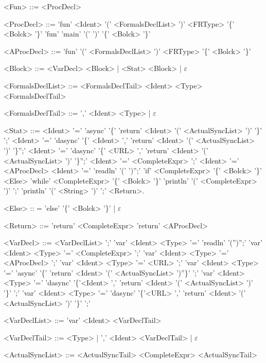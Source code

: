 \begin{grammar}
<Fun> ::=  { <ProcDecl> } 

<ProcDecl> ::=  
'fun' <Ident> '(' <FormalsDeclList> ')' <FRType> '\{' <Bolck> '\}'
\alt 'fun' 'main' '(' ')' '\{' <Bolck> '\}' 

<AProcDecl> ::= 'fun' '(' <FormalsDeclList> ')' <FRType> '\{' <Bolck> '\}'

<Block> ::=  <VarDecl> <Block> | <Stat> <Block> | $\varepsilon$

<FormalsDeclList> ::= 	<FormalsDeclTail> 
						\alt <Ident> <Type> <FormalsDeclTail> 

<FormalsDeclTail> ::= ',' <Ident> <Type> | $\varepsilon$

<Stat> ::= 
			<Ident> '=' 'async' '\{' 'return' <Ident> '(' <ActualSyncList> ')' '\}' ';'
			\alt <Ident> '=' 'dasync' '\{' <Ident> ',' 'return' <Ident> '(' <ActualSyncList> ')' '\}'';'
			\alt <Ident> '=' 'dasync' '\{' <URL> ',' 'return' <Ident> '(' <ActualSyncList> ')' '\}'';'
			\alt <Ident> '=' <CompleteExpr> ';'
			\alt <Ident> '=' <AProcDecl>                                  
			\alt <Ident> '=' 'readln' '(' ')'';'
			\alt 'if' <CompleteExpr> '\{' <Bolck> '\}' <Else>                                        
			\alt 'while' <CompleteExpr> '\{' <Bolck> '\}'                                                      
			\alt 'println' '(' <CompleteExpr> ')' ';'
			\alt 'println' '(' <String> ')' ';'
			\alt <Return>.

<Else> :: =  'else' '\{' <Bolck> '\}' | $\varepsilon$

<Return> ::= 
			'return' <CompleteExpr>
			\alt 'return' <AProcDecl>

<VarDecl> ::= 	<VarDeclList> ';' 
				'var' <Ident>  <Type> '=' 'readln' '('')'';'
				\alt 'var' <Ident>  <Type> '=' <CompleteExpr> ';' 
				\alt 'var' <Ident>  <Type> '=' <AProcDecl> ';'
				\alt 'var' <Ident>  <Type> '=' <URL> ';'
				\alt 'var' <Ident>  <Type> '=' 'async' '\{' 'return' <Ident> '(' <ActualSyncList> ')''\}' ';'
				\alt 'var' <Ident>  <Type> '=' 'dasync' '\{'<Ident> ',' 'return' <Ident> '(' <ActualSyncList> ')' '\}' ';'
				\alt 'var' <Ident>  <Type> '=' 'dasync' '\{'<URL> ',' 'return' <Ident> '(' <ActualSyncList> ')' '\}' ';'
							
<VarDeclList> ::= 'var' <Ident> <VarDeclTail>

<VarDeclTail> ::= <Type> | ',' <Ident> <VarDeclTail> | $\varepsilon$ 

<ActualSyncList> ::= <ActualSyncTail>
\alt <CompleteExpr> <ActualSyncTail>


\end{grammar}
